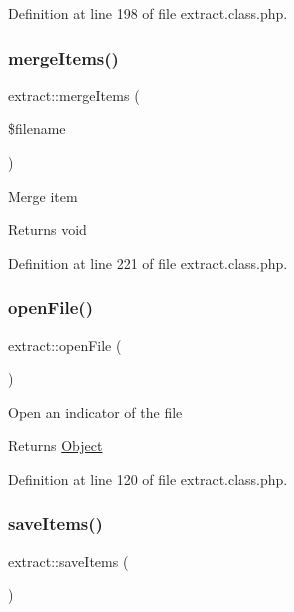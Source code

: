 Definition at line 198 of file extract.\+class.\+php.

\mbox{\label{classextract_a03f6e68633c0e2f0885d8990efc21b5d}} 
\subsubsection{\texorpdfstring{merge\+Items()}{mergeItems()}}
{\footnotesize\ttfamily extract\+::merge\+Items (\begin{DoxyParamCaption}\item[{}]{\$filename }\end{DoxyParamCaption})}

Merge item \begin{DoxyReturn}{Returns}
void 
\end{DoxyReturn}


Definition at line 221 of file extract.\+class.\+php.

\mbox{\label{classextract_afe5c47d4a18adeb1cb9fb0e7450def78}} 
\subsubsection{\texorpdfstring{open\+File()}{openFile()}}
{\footnotesize\ttfamily extract\+::open\+File (\begin{DoxyParamCaption}{ }\end{DoxyParamCaption})}

Open an indicator of the file \begin{DoxyReturn}{Returns}
\hyperlink{classObject}{Object} 
\end{DoxyReturn}


Definition at line 120 of file extract.\+class.\+php.

\mbox{\label{classextract_a00d078dc669fb822cbf073b04ec8668d}} 
\subsubsection{\texorpdfstring{save\+Items()}{saveItems()}}
{\footnotesize\ttfamily extract\+::save\+Items (\begin{DoxyParamCaption}{ }\end{DoxyParamCaption})}

